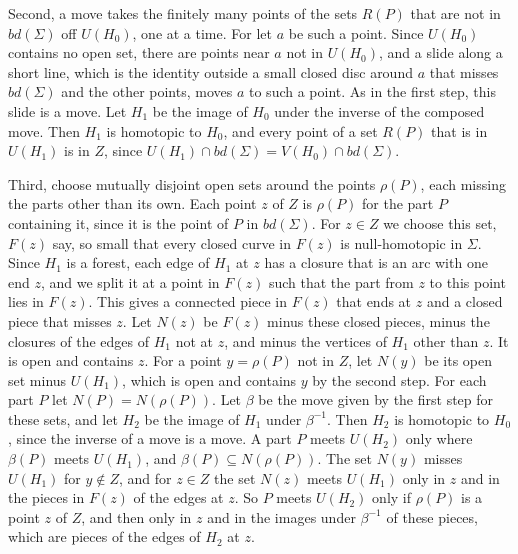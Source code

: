 {Second, a move takes the finitely many points of the sets $R(P)$ that are not in $bd(\Sigma)$ off
$U(H_0)$, one at a time. For let $a$ be such a point. Since $U(H_0)$ contains no open set, there are
points near $a$ not in $U(H_0)$, and a slide along a short line, which is the identity outside a small
closed disc around $a$ that misses $bd(\Sigma)$ and the other points, moves $a$ to such a point. As in
the first step, this slide is a move. Let $H_1$ be the image of $H_0$ under
the inverse of the composed move. Then $H_1$ is homotopic to $H_0$, and every point of a set $R(P)$ that is
in $U(H_1)$ is in $Z$, since $U(H_1) \cap bd(\Sigma) = V(H_0) \cap bd(\Sigma)$.

Third, choose mutually disjoint open sets around the points $\rho(P)$, each missing the parts other
than its own. Each point $z$ of $Z$ is $\rho(P)$ for the part $P$ containing it, since it is the point
of $P$ in $bd(\Sigma)$. For $z \in Z$ we choose this set, $F(z)$ say, so small that every closed curve
in $F(z)$ is null-homotopic in $\Sigma$. Since $H_1$ is a forest, each edge of $H_1$ at $z$ has a
closure that is an arc with one end $z$, and we split it at a point in $F(z)$ such that the part from
$z$ to this point lies in $F(z)$. This gives a connected piece in $F(z)$ that ends at $z$ and a
closed piece that misses $z$. Let $N(z)$ be $F(z)$ minus these closed pieces, minus the closures of the
edges of $H_1$ not at $z$, and minus the vertices of $H_1$ other than $z$. It is open and contains
$z$. For a point $y = \rho(P)$ not in $Z$, let $N(y)$ be its open set minus $U(H_1)$, which is open and
contains $y$ by the second step. For each part $P$ let $N(P) = N(\rho(P))$. Let $\beta$ be the move
given by the first step for these sets, and let $H_2$ be the image of $H_1$ under $\beta^{-1}$. Then
$H_2$ is homotopic to $H_0$, since the inverse of a move is a move. A part $P$ meets $U(H_2)$ only
where $\beta(P)$ meets $U(H_1)$, and $\beta(P) \subseteq N(\rho(P))$. The set $N(y)$ misses $U(H_1)$ for
$y \notin Z$, and for $z \in Z$ the set $N(z)$ meets $U(H_1)$ only in $z$ and in the pieces in $F(z)$ of
the edges at $z$. So $P$ meets $U(H_2)$ only if $\rho(P)$ is a point $z$ of $Z$, and then only in $z$
and in the images under $\beta^{-1}$ of these pieces, which are pieces of the edges of $H_2$ at $z$.

}
